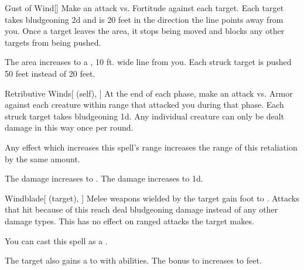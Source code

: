 \lowercase{\hypertarget{spell:Gust of Wind}{}}\label{spell:Gust of Wind}
\begin{freeability}[Rank 3]{\hypertarget{spell:Gust of Wind}{Gust of Wind}}[]
Make an attack vs. Fortitude against each target.
\hit Each target takes bludgeoning  \minus2d and is  20 feet in the direction the line points away from you.
Once a target leaves the area, it stops being moved and blocks any other targets from being pushed.

\rankline
{} The area increases to a \areahuge, 10 ft. wide line from you.
 Each struck target is pushed 50 feet instead of 20 feet.
\end{freeability}
\vspace{0.25em}



\lowercase{\hypertarget{spell:Retributive Winds}{}}\label{spell:Retributive Winds}
\begin{attuneability}[Rank 3]{\hypertarget{spell:Retributive Winds}{Retributive Winds}}[ (self), ]
At the end of each phase, make an attack vs. Armor against each creature within \rngclose range that attacked you during that phase.
\hit Each struck target takes bludgeoning  \minus1d.
Any individual creature can only be dealt damage in this way once per round.

Any effect which increases this spell's range increases the range of this retaliation by the same amount.

\rankline
{} The damage increases to .
 The damage increases to  \plus1d.
\end{attuneability}
\vspace{0.25em}



\lowercase{\hypertarget{spell:Windblade}{}}\label{spell:Windblade}
\begin{attuneability}[Rank 3]{\hypertarget{spell:Windblade}{Windblade}}[ (target), ]
Melee weapons wielded by the target gain  foot  to .
Attacks that hit because of this reach deal bludgeoning damage instead of any other damage types.
This has no effect on ranged attacks the target makes.

You can cast this spell as a .

\rankline
{} The target also gains a   to  with  abilities.
 The bonus to  increases to  feet.
\end{attuneability}
\vspace{0.25em}



